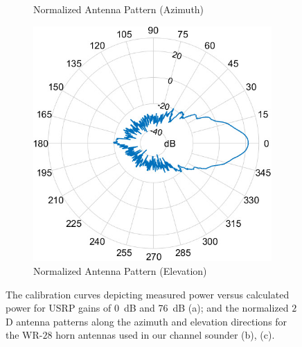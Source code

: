 \documentclass[10pt, twocolumn]{IEEEtran}
\begin{document}
\begin{figure} [t]
\begin{subfigure}{0.310\linewidth}
         \caption{Normalized Antenna Pattern (Azimuth)}
         \label{F3b}
     \end{subfigure}
     \begin{subfigure}{0.310\linewidth}
         \centering
         \includegraphics[width=1.0\linewidth]{figs/antenna_elevation.jpg}
         \caption{Normalized Antenna Pattern (Elevation)}
         \label{F3c}
     \end{subfigure}
     \vspace{-6mm}
     \caption{The calibration curves depicting measured power versus calculated power for USRP gains of \SI{0}{\deci\bel} and \SI{76}{\deci\bel} (a); and the normalized $2$D antenna patterns along the azimuth and elevation directions for the WR-$28$ horn antennas used in our channel sounder (b), (c).}
     \label{F3}
     \vspace{-3mm}
\end{figure}
\end{document}
